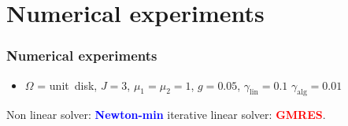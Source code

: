 \documentclass[10 pt]{beamer}
\begin{document}
\section{Numerical experiments}
\begin{frame}
\frametitle{Numerical experiments}

\begin{itemize}
\item
$\Omega$ = \mbox{unit disk}, $J = 3$, $\mu_1= \mu_2 = 1$, $g = 0.05$, $\gamma_{\mathrm{lin}}=0.1$ $\gamma_{\mathrm{alg}}=0.01$
\end{itemize}
Non linear solver: \textcolor{blue}{\textbf{Newton-min}}  \qquad iterative linear solver: \textcolor{red}{\textbf{GMRES}}.


\end{frame}
\end{document}
